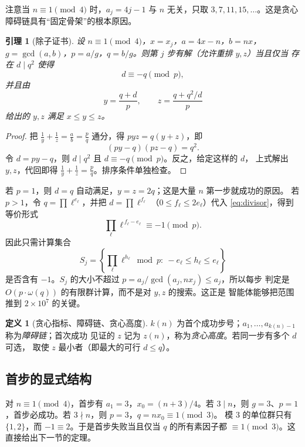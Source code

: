 \documentclass[11pt,a4paper]{ctexart}
\newtheorem{lemma}[theorem]{引理}
\theoremstyle{definition}
\newtheorem{definition}[theorem]{定义}
\theoremstyle{remark}
\begin{document}
注意当 $n\equiv1\pmod4$ 时，$a_j=4j-1$ 与 $n$ 无关，只取
$3,7,11,15,\ldots$。这是贪心障碍链具有“固定骨架”的根本原因。

\begin{lemma}[除子证书]\label{lem:cert}
设 $n\equiv1\pmod4$，$x=x_j$，$a=4x-n$，$b=nx$，
$g=\gcd(a,b)$，$p=a/g$，$q=b/g$。则第 $j$ 步有解（允许重排 $y,z$）当且仅当
存在 $d\mid q^2$ 使得
\begin{equation}\label{eq:divisor}
d\equiv -q\pmod p,
\end{equation}
并且由
\[
y=\frac{q+d}{p},\qquad z=\frac{q+q^2/d}{p}
\]
给出的 $y,z$ 满足 $x\le y\le z$。
\end{lemma}

\begin{proof}
把 $\frac1y+\frac1z=\frac{a}{b}=\frac pq$ 通分，得
$p yz=q(y+z)$，即
\[
(py-q)(pz-q)=q^2 .
\]
令 $d=py-q$，则 $d\mid q^2$ 且 $d\equiv-q\pmod p$。反之，给定这样的 $d$，
上式解出 $y,z$，代回即得 $\frac1y+\frac1z=\frac pq$。排序条件单独检查。
\end{proof}

若 $p=1$，则 $d=q$ 自动满足，$y=z=2q$；这是大量 $n$ 第一步就成功的原因。
若 $p>1$，令 $q=\prod\ell^{e_\ell}$，并把 $d=\prod\ell^{f_\ell}$
（$0\le f_\ell\le2e_\ell$）代入 \eqref{eq:divisor}，得到等价形式
\[
\prod_\ell \ell^{\,f_\ell-e_\ell}\equiv -1\pmod p .
\]
因此只需计算集合
\[
S_j=\left\{\prod_\ell \ell^{h_\ell}\bmod p:\ -e_\ell\le h_\ell\le e_\ell\right\}
\]
是否含有 $-1$。$S_j$ 的大小不超过 $p=a_j/\gcd(a_j,nx_j)\le a_j$，所以每步
判定是 $O(p\cdot\omega(q))$ 的有限群计算，而不是对 $y,z$ 的搜索。这正是
智能体能够把范围推到 $2\times10^7$ 的关键。

\begin{definition}[贪心指标、障碍链、贪心高度]
$k(n)$ 为首个成功步号；$a_1,\ldots,a_{k(n)-1}$ 称为\emph{障碍链}；首次成功
见证的 $z$ 记为 $z(n)$，称为\emph{贪心高度}。若同一步有多个 $d$ 可选，
取使 $z$ 最小者（即最大的可行 $d\le q$）。
\end{definition}

\subsection{首步的显式结构}

对 $n\equiv1\pmod4$，首步有 $a_1=3$，$x_0=(n+3)/4$。若 $3\mid n$，则
$g=3$、$p=1$，首步必成功。若 $3\nmid n$，则 $p=3$，$q=nx_0\equiv1\pmod3$。
模 $3$ 的单位群只有 $\{1,2\}$，而 $-1\equiv2$。于是首步失败当且仅当
$q$ 的所有素因子都 $\equiv1\pmod3$。这直接给出下一节的定理。
\end{document}
